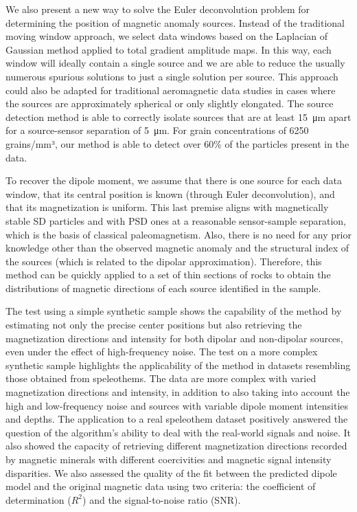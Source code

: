 We also present a new way to solve the Euler deconvolution problem for determining the position of magnetic anomaly sources. Instead of the traditional moving window approach, we select data windows based on the Laplacian of Gaussian method applied to total gradient amplitude maps.
In this way, each window will ideally contain a single source and we are able to reduce the usually numerous spurious solutions to just a single solution per source.
This approach could also be adapted for traditional aeromagnetic data studies in cases where the sources are approximately spherical or only slightly elongated.
The source detection method is able to correctly isolate sources that are at
least \qty{15}{\um} apart for a source-sensor separation of \qty{5}{\um}.
For grain concentrations of 6250 grains/mm³, our method is
able to detect over 60\% of the particles present in the data.

To recover the dipole moment, we assume that there is one source for each data window, that its central position is known (through Euler deconvolution), and that its magnetization is uniform.
This last premise aligns with magnetically stable SD particles and with PSD ones at a reasonable sensor-sample separation, which is the basis of classical paleomagnetism.
Also, there is no need for any prior knowledge other than the observed magnetic anomaly and the structural index of the sources (which is related to the dipolar approximation).
Therefore, this method can be quickly applied to a set of thin sections of rocks to obtain the distributions of magnetic directions of each source identified in the sample.

The test using a simple synthetic sample shows the capability of the method by estimating not only the precise center positions but also retrieving the magnetization directions and intensity for both dipolar and non-dipolar sources, even under the effect of high-frequency noise.
The test on a more complex synthetic sample highlights the applicability of the method in datasets resembling those obtained from speleothems.
The data are more complex with varied magnetization directions and intensity, in addition to also taking into account the high and low-frequency noise and sources with variable dipole moment intensities and depths.
The application to a real speleothem dataset positively answered the question of the algorithm's ability to deal with the real-world signals and noise.
It also showed the capacity of retrieving different magnetization directions recorded by magnetic minerals with different coercivities and magnetic signal intensity disparities.
We also assessed the quality of the fit between the predicted dipole model and the original magnetic data using two criteria: the coefficient of determination ($R^2$) and the signal-to-noise ratio (SNR).

